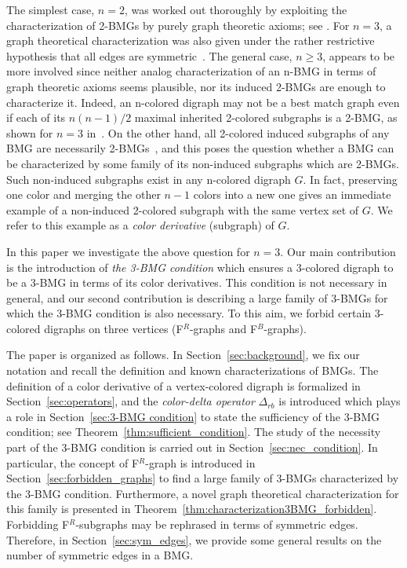 \documentclass[final,3p,times]{elsarticle}
\begin{document}
The simplest case, $n=2$, was worked out thoroughly by exploiting the characterization of 2-BMGs by purely graph theoretic axioms; see \cite{Geiss:19a,Geiss:20b,Korchmaros:21a,korchmaros2021quasi,Schaller:21a,Schaller:21b,Schaller:21c,Schaller:21d}. For $n=3$, a graph theoretical characterization was also given under the rather restrictive hypothesis that all edges are symmetric~\cite{geiss2020reciprocal}. The general case, $n\ge 3$, appears to be more involved since neither analog characterization of an n-BMG in terms of graph theoretic axioms seems plausible, nor its induced 2-BMGs are enough to characterize it. Indeed, an n-colored digraph may not be a best match graph even if each of its $n(n-1)/2$ maximal inherited 2-colored subgraphs is a 2-BMG, as shown for $n=3$ in~\cite[Figure 1]{schaller2021corrigendum}. On the other hand, all 2-colored induced subgraphs of any BMG are necessarily 2-BMGs~\cite[Corollary 5]{Geiss:19a}, and this poses the question whether a BMG can be characterized by some family of its non-induced subgraphs which are 2-BMGs. Such non-induced subgraphs exist in any n-colored digraph $G$. In fact, preserving one color and merging the other $n-1$ colors into a new one gives an immediate example of a non-induced 2-colored subgraph with the same vertex set of $G$. We refer to this example as a \emph{color derivative} (subgraph) of $G$.

In this paper we investigate the above question for $n=3$. Our main contribution is the introduction of \emph{the 3-BMG condition} which ensures a 3-colored digraph to be a 3-BMG in terms of its color derivatives. This condition is not necessary in general, and our second contribution is describing a large family of 3-BMGs for which the 3-BMG condition is also necessary. To this aim, we forbid certain 3-colored digraphs on three vertices (F$^R$-graphs and F$^B$-graphs). 

The paper is organized as follows. In Section~\ref{sec:background}, we fix our notation and recall the definition and known characterizations of BMGs. The definition of a color derivative of a vertex-colored digraph is formalized in Section~\ref{sec:operators}, and the \emph{color-delta operator} $\Delta_{rb}$ is introduced which plays a role in Section~\ref{sec:3-BMG condition} to state the sufficiency of the 3-BMG condition; see Theorem~\ref{thm:sufficient_condition}. The study of the necessity part of the 3-BMG condition is carried out in Section~\ref{sec:nec_condition}. In particular, the concept of F$^R$-graph is introduced in Section~\ref{sec:forbidden_graphs} to find a large family of 3-BMGs characterized by the 3-BMG condition. Furthermore, a novel graph theoretical characterization for this family is presented in Theorem~\ref{thm:characterization3BMG_forbidden}. Forbidding F$^R$-subgraphs may be rephrased in terms of symmetric edges. Therefore, in Section~\ref{sec:sym_edges}, we provide some general results on the number of symmetric edges in a BMG.
\end{document}
